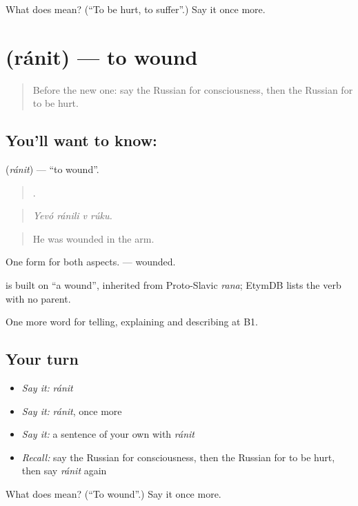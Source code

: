 \begin{tcolorbox}[breakable,colback=teal!4,colframe=teal!35!black,title={Before you move on}]
What does  mean? (\textquotedblleft{}To be hurt, to suffer\textquotedblright{}.) Say it once more.
\end{tcolorbox}
\section[\texorpdfstring{\ru{ранить} (ránit)}{ранить (ránit)}]{ (ránit) — to wound}

\label{lesson:RU-C297-ranit}



\begin{quote}
Before the new one: say the Russian for consciousness, then the Russian for to be hurt.
\end{quote}

\subsection*{You'll want to know: }
\textbf{} (\emph{ránit}) — \textquotedblleft{}to wound\textquotedblright{}.

\begin{quote}
   .
\end{quote}

\begin{quote}
\emph{Yevó ránili v rúku.}
\end{quote}

\begin{quote}
He was wounded in the arm.
\end{quote}

One form for both aspects. \emph{} — wounded.

\begin{cousinweb}
\emph{} is built on \emph{} \textquotedblleft{}a wound\textquotedblright{}, inherited from Proto-Slavic \emph{rana}; EtymDB lists the verb with no parent.
\end{cousinweb}

\begin{grammarlens}[title={What you've built}]
One more word for telling, explaining and describing at B1.
\end{grammarlens}

\subsection*{Your turn}
\begin{itemize}
\raggedright
  \item \emph{Say it:} \emph{ránit}
  \item \emph{Say it:} \emph{ránit}, once more
  \item \emph{Say it:} a sentence of your own with \emph{ránit}
  \item \emph{Recall:} say the Russian for consciousness, then the Russian for to be hurt, then say \emph{ránit} again
\end{itemize}

\begin{tcolorbox}[breakable,colback=teal!4,colframe=teal!35!black,title={Before you move on}]
What does  mean? (\textquotedblleft{}To wound\textquotedblright{}.) Say it once more.
\end{tcolorbox}
